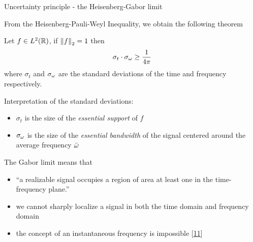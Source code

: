 \documentclass[10pt,american,ignorenonframetext,aspectratio=1610]{beamer}
\providecommand{\tightlist}{%
  \setlength{\itemsep}{0pt}\setlength{\parskip}{0pt}}
\theoremstyle{remark}
\begin{document}
\begin{frame}{Uncertainty principle - the Heisenberg-Gabor limit}
\protect\hypertarget{uncertainty-principle---the-heisenberg-gabor-limit}{}

From the Heisenberg-Pauli-Weyl Inequality, we obtain the following
theorem

\begin{theorem}
Let $f\in L^2(\mathbb{R})$, if $\left\lVert f\right\rVert_2 = 1$ then
$$\sigma_t\cdot\sigma_\omega \geq \frac{1}{4\pi}$$
where $\sigma_t$ and $\sigma_\omega$ are the standard deviations of the time and frequency respectively.
\end{theorem}

Interpretation of the standard deviations:

\begin{itemize}
\tightlist
\item
  \(\sigma_t\) is the size of the \emph{essential support} of \(f\)
\item
  \(\sigma_\omega\) is the size of the \emph{essential bandwidth} of the
  signal centered around the average frequency \(\bar{\omega}\)
\end{itemize}

The Gabor limit means that

\begin{itemize}
\tightlist
\item
  ``a realizable signal occupies a region of area at least one in the
  time-frequency plane.''
\item
  we cannot sharply localize a signal in both the time domain and
  frequency domain
\item
  the concept of an instantaneous frequency is impossible
  {[}\protect\hyperlink{ref-grochenig2001}{11}{]}
\end{itemize}

\end{frame}
\end{document}
